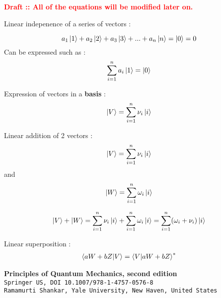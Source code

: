 \documentclass[11pt]{article}
\theoremstyle{definition}
\numberwithin{equation}{section}
\begin{document}
\clearpage

\textbf{\textcolor{red}{Draft :: All of the equations will be modified later on.}}

Linear indepenence of a series of vectors :

\begin{equation}
  a_1 \ket{1} + a_2\ket{2} + a_3 \ket{3} + ... + a_n \ket{n} = \ket{0} = 0
\end{equation}
Can be expressed such as :
\begin{equation}
\sum^{n}_{i=1} a_i \ket{1} = \ket{0} 
\end{equation}

Expression of vectors in a \textbf{basis} :
\begin{equation}
\ket{V} = \sum^{n}_{i=1} \nu_i \ket{i} 
\end{equation}

Linear addition of 2 vectors :
\begin{equation}
\ket{V} = \sum^{n}_{i=1} \nu_i \ket{i} 
\end{equation}
and
\begin{equation}
\ket{W} = \sum^{n}_{i=1} \omega_i \ket{i} 
\end{equation}

\begin{equation}
\ket{V} + \ket{W}  = \sum^{n}_{i=1} \nu_i \ket{i} + \sum^{n}_{i=1} \omega_i \ket{i} = \sum^{n}_{i=1} (\omega_i + \nu_i) \ket{i}
 \end{equation}

Linear superposition :
\begin{align*}
    \braket{a W + b Z | V} = \braket{V | a W + b Z}^{*} 
  \end{align*}



\clearpage


\begin{thebibliography}{9}
\textbf{Principles of Quantum Mechanics, second edition}\\
\texttt{Springer US, DOI 10.1007/978-1-4757-0576-8}\\
\texttt{Ramamurti Shankar, Yale University, New Haven, United States}\\

\end{thebibliography}
\end{document}

